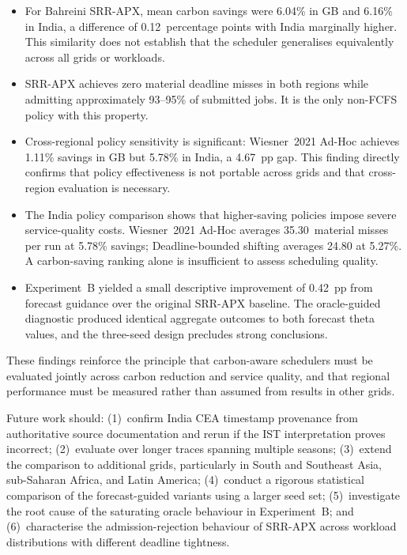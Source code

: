 \documentclass[conference]{IEEEtran}
\begin{document}
\begin{itemize}
  \item For Bahreini SRR-APX, mean carbon savings were 6.04\% in GB and 6.16\%
        in India, a difference of 0.12~percentage points with India marginally
        higher. This similarity does not establish that the scheduler generalises
        equivalently across all grids or workloads.
  \item SRR-APX achieves zero material deadline misses in both regions while
        admitting approximately 93--95\% of submitted jobs. It is the only
        non-FCFS policy with this property.
  \item Cross-regional policy sensitivity is significant: Wiesner~2021 Ad-Hoc
        achieves 1.11\% savings in GB but 5.78\% in India, a 4.67~pp gap.
        This finding directly confirms that policy effectiveness is not portable
        across grids and that cross-region evaluation is necessary.
  \item The India policy comparison shows that higher-saving policies impose
        severe service-quality costs. Wiesner~2021 Ad-Hoc averages 35.30~material
        misses per run at 5.78\% savings; Deadline-bounded shifting averages
        24.80 at 5.27\%. A carbon-saving ranking alone is insufficient to
        assess scheduling quality.
  \item Experiment~B yielded a small descriptive improvement of 0.42~pp from
        forecast guidance over the original SRR-APX baseline. The oracle-guided
        diagnostic produced identical aggregate outcomes to both forecast
        theta values, and the three-seed design precludes strong conclusions.
\end{itemize}

These findings reinforce the principle that carbon-aware schedulers must be
evaluated jointly across carbon reduction and service quality, and that regional
performance must be measured rather than assumed from results in other grids.

Future work should: (1)~confirm India CEA timestamp provenance from authoritative
source documentation and rerun if the IST interpretation proves incorrect;
(2)~evaluate over longer traces spanning multiple seasons;
(3)~extend the comparison to additional grids, particularly in South and Southeast
Asia, sub-Saharan Africa, and Latin America;
(4)~conduct a rigorous statistical comparison of the forecast-guided variants
using a larger seed set;
(5)~investigate the root cause of the saturating oracle behaviour in Experiment~B;
and (6)~characterise the admission-rejection behaviour of SRR-APX across
workload distributions with different deadline tightness.



\end{document}
